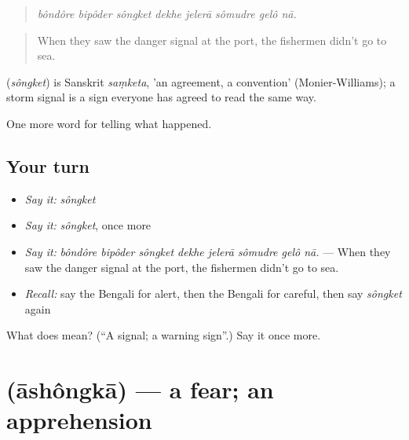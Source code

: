 \begin{quote}
       
\end{quote}

\begin{quote}
\emph{bôndôre bipôder sôngket dekhe jelerā sômudre gelô nā.}
\end{quote}

\begin{quote}
When they saw the danger signal at the port, the fishermen didn't go to sea.
\end{quote}

\begin{cousinweb}
\textbf{} (\emph{sôngket}) is Sanskrit \emph{saṃketa}, 'an agreement, a convention' (Monier-Williams); a storm signal is a sign everyone has agreed to read the same way.
\end{cousinweb}

\begin{grammarlens}[title={What you've built}]
One more word for telling what happened.
\end{grammarlens}

\subsection*{Your turn}
\begin{itemize}
\raggedright
  \item \emph{Say it:} \emph{sôngket}
  \item \emph{Say it:} \emph{sôngket}, once more
  \item \emph{Say it:} \emph{bôndôre bipôder sôngket dekhe jelerā sômudre gelô nā.} — When they saw the danger signal at the port, the fishermen didn't go to sea.
  \item \emph{Recall:} say the Bengali for alert, then the Bengali for careful, then say \emph{sôngket} again
\end{itemize}

\begin{tcolorbox}[breakable,colback=teal!4,colframe=teal!35!black,title={Before you move on}]
What does  mean? (\textquotedblleft{}A signal; a warning sign\textquotedblright{}.) Say it once more.
\end{tcolorbox}
\section[\texorpdfstring{\bn{আশঙ্কা} (āshôngkā)}{আশঙ্কা (āshôngkā)}]{ (āshôngkā) — a fear; an apprehension}

